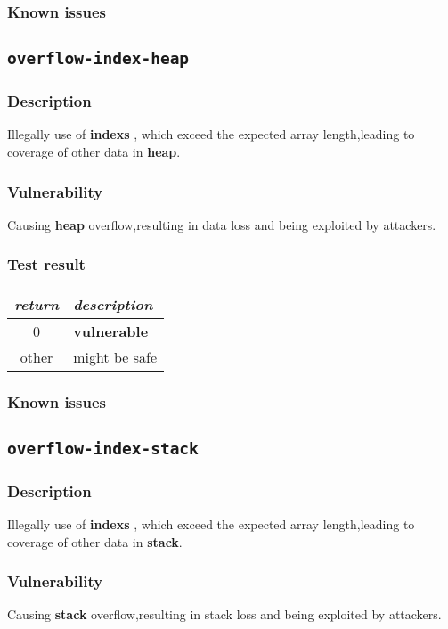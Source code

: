 \documentclass[a4paper]{book}
\begin{document}
\subsubsection{Known issues}


\newpage

\subsection{\texttt{overflow-index-heap}}\label{test-overflow-index-heap}
\subsubsection{Description}
Illegally use of \textbf{indexs} , which exceed the expected array length,leading to coverage of other data in \textbf{heap}.\subsubsection{Vulnerability}
Causing \textbf{heap} overflow,resulting in data loss and being exploited by attackers.
\subsubsection{Test result}
\begin{tabular}{cl}
  \toprule
  \emph{return}  & \emph{description} \\
  \midrule
  0              & \textbf{vulnerable} \\
  other          & might be safe \\
  \bottomrule
\end{tabular}
\subsubsection{Known issues}
\newpage

\subsection{\texttt{overflow-index-stack}}\label{test-overflow-index-stack}
\subsubsection{Description}
Illegally use of \textbf{indexs} , which exceed the expected array length,leading to coverage of other data in \textbf{stack}.
\subsubsection{Vulnerability}
Causing \textbf{stack} overflow,resulting in stack loss and being exploited by attackers.
\end{document}
